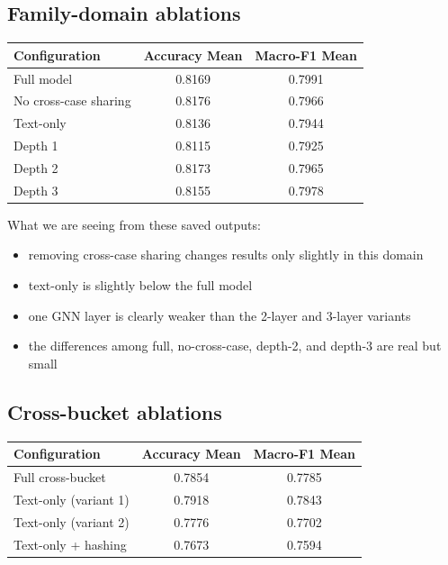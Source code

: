 \documentclass[12pt,a4paper]{article}
\begin{document}
\subsection*{Family-domain ablations}

\begin{center}
\small
\begin{tabular}{lcc}
\toprule
\textbf{Configuration} & \textbf{Accuracy Mean} & \textbf{Macro-F1 Mean} \\
\midrule
Full model & 0.8169 & 0.7991 \\
No cross-case sharing & 0.8176 & 0.7966 \\
Text-only & 0.8136 & 0.7944 \\
Depth 1 & 0.8115 & 0.7925 \\
Depth 2 & 0.8173 & 0.7965 \\
Depth 3 & 0.8155 & 0.7978 \\
\bottomrule
\end{tabular}
\end{center}

What we are seeing from these saved outputs:

\begin{itemize}[noitemsep]
\item removing cross-case sharing changes results only slightly in this domain
\item text-only is slightly below the full model
\item one GNN layer is clearly weaker than the 2-layer and 3-layer variants
\item the differences among full, no-cross-case, depth-2, and depth-3 are real but small
\end{itemize}

\subsection*{Cross-bucket ablations}

\begin{center}
\small
\begin{tabular}{lcc}
\toprule
\textbf{Configuration} & \textbf{Accuracy Mean} & \textbf{Macro-F1 Mean} \\
\midrule
Full cross-bucket & 0.7854 & 0.7785 \\
Text-only (variant 1) & 0.7918 & 0.7843 \\
Text-only (variant 2) & 0.7776 & 0.7702 \\
Text-only + hashing & 0.7673 & 0.7594 \\
\bottomrule
\end{tabular}
\end{center}
\end{document}
